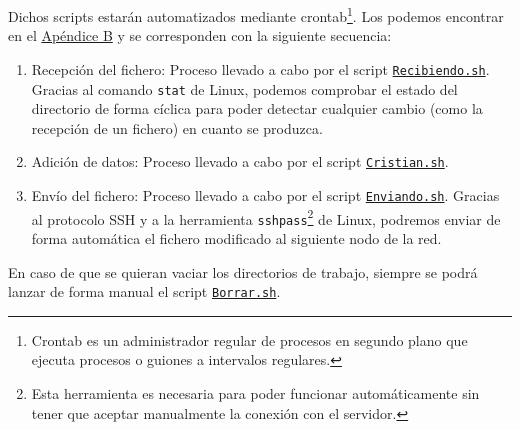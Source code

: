 Dichos scripts estarán automatizados mediante crontab\footnote{Crontab es un administrador regular de procesos en segundo plano que ejecuta procesos o guiones a intervalos regulares.}. Los podemos encontrar en el \hyperlink{Scripts}{Apéndice B} y se corresponden con la siguiente secuencia:
\begin{enumerate}
	\item Recepción del fichero: Proceso llevado a cabo por el script \hyperlink{ScriptRecibiendo}{\texttt{Recibiendo.sh}}. Gracias al comando \texttt{stat} de Linux, podemos comprobar el estado del directorio de forma cíclica para poder detectar cualquier cambio (como la recepción de un fichero) en cuanto se produzca.
	\item Adición de datos: Proceso llevado a cabo por el script \hyperlink{ScriptCristian}{\texttt{Cristian.sh}}.
	\item Envío del fichero: Proceso llevado a cabo por el script \hyperlink{ScriptEnviando}{\texttt{Enviando.sh}}. Gracias al protocolo SSH y a la herramienta \texttt{sshpass}\footnote{Esta herramienta es necesaria para poder funcionar automáticamente sin tener que aceptar manualmente la conexión con el servidor.} de Linux, podremos enviar de forma automática el fichero modificado al siguiente nodo de la red.
\end{enumerate}

En caso de que se quieran vaciar los directorios de trabajo, siempre se podrá lanzar de forma manual el script \hyperlink{ScriptBorrar}{\texttt{Borrar.sh}}.